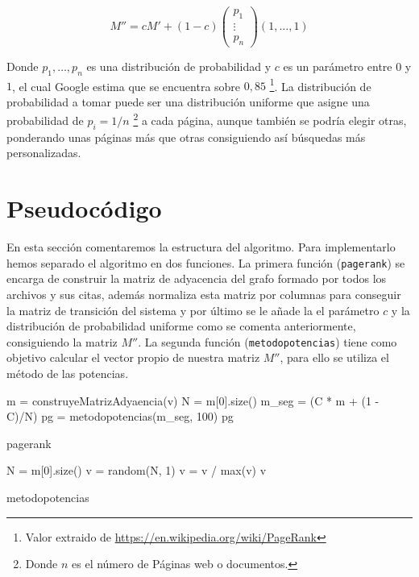 \documentclass[size=a4, parskip=half, titlepage=false, toc=flat, toc=bib, 12pt]{scrartcl}
\theoremstyle{theorem-style}
\theoremstyle{definition-style}
\theoremstyle{remark-style}
\theoremstyle{example-style}
\theoremstyle{definition-style}
\theoremstyle{remark-style}
\begin{document}
$$M'' = cM' + (1-c)\begin{pmatrix}
p_1 \\
\vdots \\
p_n \end{pmatrix} (1, \dots, 1)$$

Donde $p_1, \dots , p_n$ es una distribución de probabilidad y $c$ es un parámetro entre $0$ y $1$, el cual Google estima que se encuentra sobre $0,85$ \footnote{Valor extraido de \url{https://en.wikipedia.org/wiki/PageRank}}. La distribución de probabilidad a tomar puede ser una distribución uniforme que asigne una probabilidad de $p_i = 1/n$ \footnote{Donde $n$ es el número de Páginas web o documentos.} a cada página, aunque también se podría elegir otras, ponderando unas páginas más que otras consiguiendo así búsquedas más personalizadas.

\newpage

\section{Pseudocódigo}
En esta sección comentaremos la estructura del algoritmo. Para implementarlo hemos separado el algoritmo en dos funciones. La primera función (\verb|pagerank|) se encarga de construir la matriz de adyacencia del grafo formado por todos los archivos y sus citas, además normaliza esta matriz por columnas para conseguir la matriz de transición del sistema y por último se le añade la el parámetro $c$ y la distribución de probabilidad uniforme como se comenta anteriormente, consiguiendo la matriz $M''$. La segunda función (\verb|metodopotencias|) tiene como objetivo calcular el vector propio de nuestra matriz $M''$, para ello se utiliza el método de las potencias.

\begin{algorithm}[H]
  m = construyeMatrizAdyaencia(v)\;
  N = m[0].size()\;
  m\_seg = (C * m + (1 - C)/N)\;
  pg = metodopotencias(m\_seg, 100)\;
  \Return pg
\caption{pagerank}
\end{algorithm}

\begin{algorithm}[H]

  N = m[0].size()\;
  v = random(N, 1)\;
  v = v / max(v)\;
  \Return v

\caption{metodopotencias}
\end{algorithm}
\end{document}

